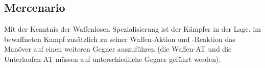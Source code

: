 \subsection{Mercenario}
{\sffamily\color{black}
Mit der Kenntnis der Waffenlosen Spezialisierung
 ist der Kämpfer in der Lage, im
bewaffneten Kampf zusätzlich zu seiner Waffen-Aktion und {}-Reaktion
das Manöver  auf einen
weiteren Gegner auszuführen (die Waffen-AT und die Unterlaufen-AT
müssen auf unterschiedliche Gegner geführt werden).}

